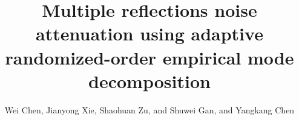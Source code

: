   
\title{Multiple reflections noise attenuation using adaptive randomized-order empirical mode decomposition}
\renewcommand{\thefootnote}{\fnsymbol{footnote}}

\author{Wei Chen\footnotemark[1]\footnotemark[2], Jianyong Xie\footnotemark[3]\footnotemark[4], Shaohuan Zu\footnotemark[3]\footnotemark[5], and Shuwei Gan\footnotemark[3], and Yangkang Chen\footnotemark[6]}
\address{
\footnotemark[1]
Key Laboratory of Exploration Technology for Oil and Gas Resources of Ministry of Education, Yangtze University, Wuhan, Hubei, 430100, China \\
\footnotemark[2]
Hubei Cooperative Innovation Center of Unconventional Oil and Gas, Wuhan, Hubei 430100, China, Email: chenwei2014@yangtzeu.edu.cn \\
\footnotemark[3]State Key Laboratory of Petroleum Resources and Prospecting \\
China University of Petroleum \\
Fuxue Road 18th\\
Beijing, China, 102200 \\
\footnotemark[4]
Department of Physics, 
University of Alberta, 
Edmonton Alberta, T6G 2E1, Canada,
Emails: xjyshl@sina.com\\
\footnotemark[5] Modeling and Imaging Laboratory\\
Earth and Planetary Sciences\\
University of California\\
Santa Cruz, CA 95064\\
zushaohuan@qq.com\\
\footnotemark[6]
School of Earth Sciences\\
Zhejiang University\\
Hangzhou, Zhejiang Province, China, 310027\\
chenyk2016@gmail.com\\
}

\maketitle

